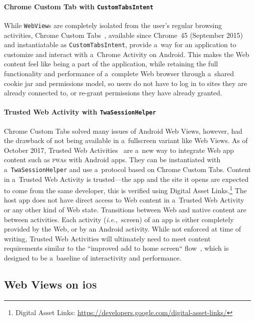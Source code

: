 \documentclass[sigconf]{acmart}
\begin{document}
\paragraph{Chrome Custom Tab with \texttt{CustomTabsIntent}}

While \texttt{WebView}s are completely isolated from the user's regular browsing activities,
Chrome Custom Tabs~\cite{kinlan2016customtabs}, available since Chrome~45 (September 2015)
and instantiatable as \texttt{CustomTabsIntent}, provide a~way for an application
to customize and interact with a~Chrome Activity on Android.
This makes the Web content feel like being a part of the application,
while retaining the full functionality and performance of a~complete Web browser
through a~shared cookie jar and permissions model, so users do not have to log in
to sites they are already connected to, or re-grant permissions they have already granted.

\paragraph{Trusted Web Activity with \texttt{TwaSessionHelper}}

Chrome Custom Tabs solved many issues of Android Web Views,
however, had the drawback of not being available in a~fullscreen variant like Web Views.
As of October 2017, Trusted Web Activities~\cite{googledevelopers2017twa} are a~new way to
integrate Web app content such as \textsc{pwa}s with Android apps.
They can be instantiated with a~\texttt{TwaSessionHelper}
and use a~protocol based on Chrome Custom Tabs.
Content in a~Trusted Web Activity is trusted---the app and the site it opens
are expected to come from the same developer, this is verified using Digital Asset
Links.\footnote{Digital Asset Links:
\url{https://developers.google.com/digital-asset-links/}}
The host app does not have direct access to Web content in a~Trusted Web Activity
or any other kind of Web state.
Transitions between Web and native content are between activities.
Each activity (\emph{i.e.},\ screen) of an app is either completely provided by the Web,
or by an Android activity.
While not enforced at time of writing, Trusted Web Activities
will ultimately need to meet content requirements
similar to the ``improved add to home screen`` flow~\cite{kinlan2017a2hs},
which is designed to be a~baseline of interactivity and performance.

\subsection{Web Views on i\textsc{os}}
\end{document}
